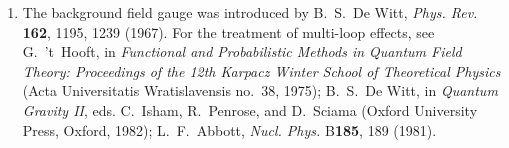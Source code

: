 \begin{enumerate}
  \item {}\label{ch17-ref-5}
  The background field gauge was introduced by B.~S.~De Witt, \textit{Phys. Rev.} \textbf{162}, 1195, 1239 (1967). For the treatment of multi-loop effects, see G.~'t~Hooft, in \textit{Functional and Probabilistic Methods in Quantum Field Theory: Proceedings of the 12th Karpacz Winter School of Theoretical Physics} (Acta Universitatis Wratislavensis no.~38, 1975); B.~S.~De Witt, in \textit{Quantum Gravity II}, eds. C.~Isham, R.~Penrose, and D.~Sciama (Oxford University Press, Oxford, 1982); L.~F.~Abbott, \textit{Nucl. Phys.} B\textbf{185}, 189 (1981).
\end{enumerate}
